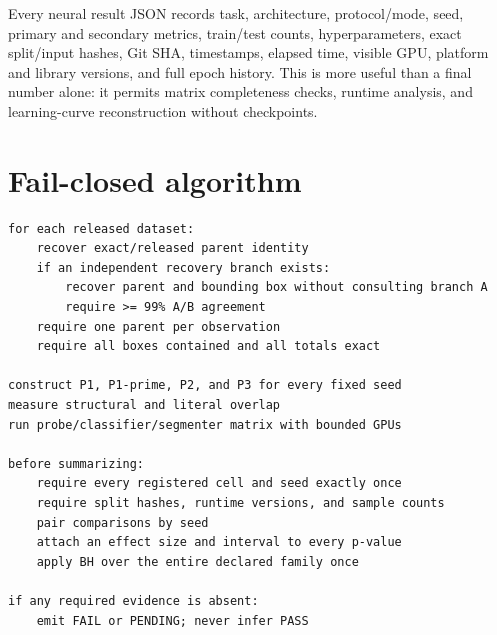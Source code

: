 Every neural result JSON records task, architecture, protocol/mode, seed, primary and secondary metrics, train/test counts, hyperparameters, exact split/input hashes, Git SHA, timestamps, elapsed time, visible GPU, platform and library versions, and full epoch history. This is more useful than a final number alone: it permits matrix completeness checks, runtime analysis, and learning-curve reconstruction without checkpoints.

\section{Fail-closed algorithm}

\begin{lstlisting}[style=cyto,caption={Conceptual fail-closed workflow.},label={lst:algorithm}]
for each released dataset:
    recover exact/released parent identity
    if an independent recovery branch exists:
        recover parent and bounding box without consulting branch A
        require >= 99% A/B agreement
    require one parent per observation
    require all boxes contained and all totals exact

construct P1, P1-prime, P2, and P3 for every fixed seed
measure structural and literal overlap
run probe/classifier/segmenter matrix with bounded GPUs

before summarizing:
    require every registered cell and seed exactly once
    require split hashes, runtime versions, and sample counts
    pair comparisons by seed
    attach an effect size and interval to every p-value
    apply BH over the entire declared family once

if any required evidence is absent:
    emit FAIL or PENDING; never infer PASS
\end{lstlisting}
